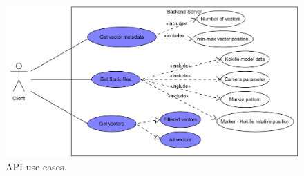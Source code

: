 \begin{figure}
	\centering
	\includegraphics[width=.75\linewidth]{images/backend/APIUseCases}
	\caption{API use cases.}
	\label{fig:backendUseCase}
\end{figure}


%				
%				
%			
